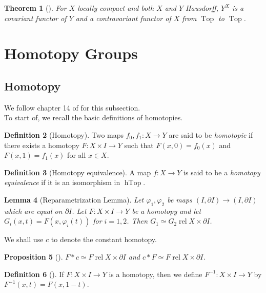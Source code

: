 \documentclass[reqno]{amsart}
\newtheorem{theorem}{Theorem}[section]
\newtheorem{lemma}[theorem]{Lemma}
\newtheorem{proposition}[theorem]{Proposition}
\theoremstyle{definition}
\newtheorem{definition}[theorem]{Definition}
\theoremstyle{remark}
\DeclareMathOperator{\Top}{Top}
\DeclareMathOperator{\hTop}{hTop}
\DeclareMathOperator{\rel}{rel}
\begin{document}
\begin{theorem}[]
    For $X$ locally compact and both $X$ and $Y$ Hausdorff,
    $Y^{X}$ is a covariant functor of $Y$ and
    a contravariant functor of $X$
    from $\Top$ to $\Top$.
\end{theorem}



\section{Homotopy Groups}

\subsection{Homotopy}
We follow chapter 14 of \cite{Bredon} for this subsection.\\

To start of, we recall the basic definitions of homotopies.

\begin{definition}[Homotopy]
    Two maps $f_0, f_1 \colon X \to Y$ are said to
    be \textit{homotopic} if there exists a homotopy
    $F \colon X \times I \to Y$ such that
    $F(x,0) = f_0(x)$ and $F(x,1) = f_1(x)$ for
    all $x \in X$.
\end{definition}

\begin{definition}[Homotopy equivalence]
    A map $f \colon X \to Y$ is said to be a \textit{homotopy
    equivalence} if it is an isomorphism in
    $\hTop$.
\end{definition}

\begin{lemma}[Reparametrization Lemma]
    Let $\varphi_1, \varphi_2$ be maps
    $\left( I, \partial I \right) \to 
    \left( I, \partial I \right) $ which are equal on
    $\partial I$. Let
    $F \colon X \times I \to Y$ be a homotopy and let
    $G_i (x,t) = F\left( x, \varphi_i(t) \right) $ for
    $i = 1,2$. Then $G_1 \simeq G_2 \rel
    X \times \partial I$.
\end{lemma}

We shall use $c$ to denote the constant homotopy.

\begin{proposition}[]
    $F * c \simeq F \rel X \times \partial I$ and
    $c * F \simeq F \rel X \times \partial I$.
\end{proposition}

\begin{definition}[]
    If $F \colon X \times I \to Y$ is a homotopy, then we
    define $F^{-1} \colon X \times I \to Y$ by
    $F^{-1}\left( x,t \right) = F(x,1-t)$. 
\end{definition}
\end{document}
